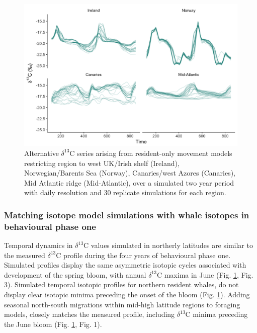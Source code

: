 \documentclass[a4paper,12pt]{article}
\begin{document}
  \begin{figure}[!htbp]
    \centering
      \includegraphics[width=\linewidth]{figures/Figure-S4-facet-wrap-d13C.png}
      \caption{Alternative $\delta^{13}$C series arising from resident-only movement models restricting region to west UK/Irish shelf (Ireland), Norwegian/Barents Sea (Norway), Canaries/west Azores (Canaries), Mid Atlantic ridge (Mid-Atlantic), over a simulated two year period with daily resolution and 30 replicate simulations for each region.} %
      \label{figs4}
  \end{figure}
 
\subsubsection*{Matching isotope model simulations with whale isotopes in behavioural phase one}
Temporal dynamics in $\delta^{13}$C values simulated in northerly latitudes are similar to the measured $\delta^{13}$C profile during the four years of behavioural phase one. 
Simulated profiles display the same asymmetric isotopic cycles associated with development of the spring bloom, with annual $\delta^{13}$C maxima in June (Fig. \ref{figs4}, Fig. 3). 
Simulated temporal isotopic profiles for northern resident whales, do not display clear isotopic minima preceding the onset of the bloom (Fig. \ref{figs4}). 
Adding seasonal north-south migrations within mid-high latitude regions to foraging models, closely matches the measured profile, including $\delta^{13}$C minima preceding the June bloom (Fig. \ref{figs4}, Fig. 1).
 
\end{document}
